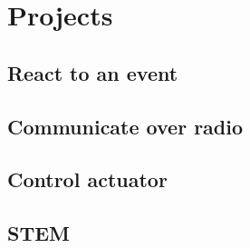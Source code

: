 \section{Projects}
\label{sec:}

\subsection{React to an event}





\subsection{Communicate over radio}





\subsection{Control actuator}


\subsection{STEM}

